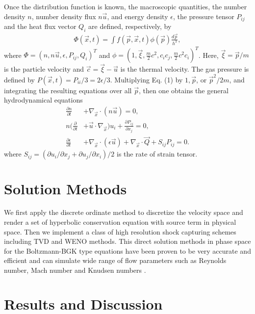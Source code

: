 \documentclass[twoside,twocolumn,prc,floats,amsmath,amssymb]{revtex4} %
\begin{document}
Once the distribution function is known, the macroscopic quantities, the
number density $n$, number density flux $n \vec u$, and energy density $\epsilon$, the pressure tensor $P_{ij}$
and the heat flux vector $Q_{i}$ are defined, respectively, by
\begin{align}
\Phi (\vec x, t) = \int  f(\vec p, \vec x, t) \phi(\vec p)\frac{d \vec p }{ h^3},
\end{align}
where $\Phi =(n, n\vec u, \epsilon, P_{ij}, Q_{i})^T$ and $\phi=(1, \vec \xi, \frac{m}{2} c^2, c_{i} c_{j}, \frac{m}{2}c^2 c_{i} )^T$.  Here, $\vec \xi =\vec p/m$ is the particle velocity and $\vec c= \vec \xi - \vec u$ is the thermal velocity.  The gas pressure is defined by $P(\vec x, t) = P_{i i}/3 = 2 \epsilon /3$. Multiplying Eq. (1) by $1, \vec p$, or $\vec p^2/2m$, and integrating the resulting equations over all $\vec p$, then one obtains the general hydrodynamical equations
\begin{align}
\frac{ \partial n}{\partial t} &+ \nabla_{\vec x} \cdot (n \vec u) = 0, \\
n ( \frac{ \partial }{\partial t} &+ \vec u \cdot \nabla_{\vec x}) u_{i} + \frac{\partial P_{ij} }{\partial x_{j} } = 0, \\ 
\frac{\partial \epsilon}{\partial t} &+ \nabla_{\vec x} \cdot (\epsilon \vec u) + \nabla_{\vec x} \cdot \vec Q + S_{ij} P_{ij} = 0.
\end{align}
where $S_{ij}=(\partial u_{i}/\partial x_{j} +
\partial u_{j}/\partial x_{i})/2$ is the rate of strain tensor.

\section{Solution Methods}

We first apply the discrete ordinate method to discretize the velocity space and render a set of hyperbolic conservation equation with source term in physical space.  Then we implement a class of high resolution shock capturing schemes including TVD and WENO methods.   This direct solution methods in phase space for the Boltzmann-BGK type equations have been proven to be very accurate and efficient and can simulate wide range of flow parameters such as Reynolds number, Mach number and Knudsen numbers \cite{Yang1995, Yang2013}.

\section{Results and Discussion}
\end{document}
